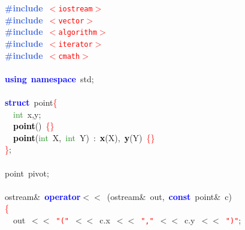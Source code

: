 
{\ttfamily \raggedright {
\noindent
\mbox{}\textbf{\textcolor{RoyalBlue}{\#include}}\ \texttt{\textcolor{Red}{$<$iostream$>$}} \\
\mbox{}\textbf{\textcolor{RoyalBlue}{\#include}}\ \texttt{\textcolor{Red}{$<$vector$>$}} \\
\mbox{}\textbf{\textcolor{RoyalBlue}{\#include}}\ \texttt{\textcolor{Red}{$<$algorithm$>$}} \\
\mbox{}\textbf{\textcolor{RoyalBlue}{\#include}}\ \texttt{\textcolor{Red}{$<$iterator$>$}} \\
\mbox{}\textbf{\textcolor{RoyalBlue}{\#include}}\ \texttt{\textcolor{Red}{$<$cmath$>$}} \\
\mbox{} \\
\mbox{}\textbf{\textcolor{Blue}{using}}\ \textbf{\textcolor{Blue}{namespace}}\ std\textcolor{BrickRed}{;} \\
\mbox{} \\
\mbox{}\textbf{\textcolor{Blue}{struct}}\ point\textcolor{Red}{\{} \\
\mbox{}\ \ \textcolor{ForestGreen}{int}\ x\textcolor{BrickRed}{,}y\textcolor{BrickRed}{;} \\
\mbox{}\ \ \textbf{\textcolor{Black}{point}}\textcolor{BrickRed}{()}\ \textcolor{Red}{\{\}} \\
\mbox{}\ \ \textbf{\textcolor{Black}{point}}\textcolor{BrickRed}{(}\textcolor{ForestGreen}{int}\ X\textcolor{BrickRed}{,}\ \textcolor{ForestGreen}{int}\ Y\textcolor{BrickRed}{)}\ \textcolor{BrickRed}{:}\ \textbf{\textcolor{Black}{x}}\textcolor{BrickRed}{(}X\textcolor{BrickRed}{),}\ \textbf{\textcolor{Black}{y}}\textcolor{BrickRed}{(}Y\textcolor{BrickRed}{)}\ \textcolor{Red}{\{\}} \\
\mbox{}\textcolor{Red}{\}}\textcolor{BrickRed}{;} \\
\mbox{} \\
\mbox{}point\ pivot\textcolor{BrickRed}{;} \\
\mbox{} \\
\mbox{}ostream\textcolor{BrickRed}{\&}\ \textbf{\textcolor{Blue}{operator}}\textcolor{BrickRed}{$<$$<$}\ \textcolor{BrickRed}{(}ostream\textcolor{BrickRed}{\&}\ out\textcolor{BrickRed}{,}\ \textbf{\textcolor{Blue}{const}}\ point\textcolor{BrickRed}{\&}\ c\textcolor{BrickRed}{)} \\
\mbox{}\textcolor{Red}{\{} \\
\mbox{}\ \ out\ \textcolor{BrickRed}{$<$$<$}\ \texttt{\textcolor{Red}{"{}("{}}}\ \textcolor{BrickRed}{$<$$<$}\ c\textcolor{BrickRed}{.}x\ \textcolor{BrickRed}{$<$$<$}\ \texttt{\textcolor{Red}{"{},"{}}}\ \textcolor{BrickRed}{$<$$<$}\ c\textcolor{BrickRed}{.}y\ \textcolor{BrickRed}{$<$$<$}\ \texttt{\textcolor{Red}{"{})"{}}}\textcolor{BrickRed}{;} \\
}}
